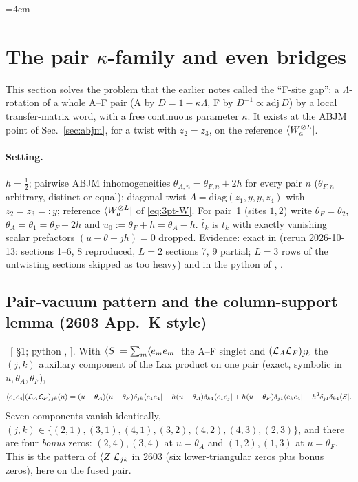\begingroup\emergencystretch=4em %
\section{The pair $\kappa$-family and even bridges}\label{sec:kappa}

This section solves the problem that the earlier notes called the ``F-site gap'': a $\Lambda$-rotation of a whole A--F pair
(A by $D=1-\kappa\Lambda$, F by $D^{-1}\propto\mathrm{adj}\,D$) by a local transfer-matrix word, with a free continuous parameter
$\kappa$. It exists at the ABJM point of Sec.~\ref{sec:abjm}, for a twist with $z_2=z_3$, on the reference $\langle W_a^{\otimes L}|$.

\paragraph{Setting.} $h=\tfrac12$; pairwise ABJM inhomogeneities $\theta_{A,n}=\theta_{F,n}+2h$ for every pair $n$ ($\theta_{F,n}$ arbitrary, distinct
or equal); diagonal twist $\Lambda=\mathrm{diag}(z_1,y,y,z_4)$ with $z_2=z_3=:y$; reference $\langle W_a^{\otimes L}|$ of \eqref{eq:3pt-W}. For pair~1
(sites $1,2$) write $\theta_F=\theta_2$, $\theta_A=\theta_1=\theta_F+2h$ and $u_0:=\theta_F+h=\theta_A-h$. $\hat t_k$ is $t_k$ with exactly
vanishing scalar prefactors $(u-\theta-jh)=0$ dropped. Evidence: exact in  (rerun 2026-10-13: sections 1--6, 8 reproduced, $L=2$ sections 7, 9 partial;
$L=3$ rows of the untwisting sections skipped as too heavy) and in the python of , .

\subsection{Pair-vacuum pattern and the column-support lemma (2603 App.~K style)}\label{sec:kappa-lemma}

\ex\ [ \S1; python , ]. With $\langle S|=\sum_m\langle e_me_m|$ the A--F singlet and
$(\mathcal L_A\mathcal L_F)_{jk}$ the $(j,k)$ auxiliary component of the Lax product on one pair (exact, symbolic in $u,\theta_A,\theta_F$),
\begin{equation}\label{eq:kappa-pattern}
 \langle e_1e_4|(\mathcal L_A\mathcal L_F)_{jk}(u)=(u-\theta_A)(u-\theta_F)\delta_{jk}\langle e_1e_4|-h(u-\theta_A)\delta_{k4}\langle e_1e_j|+h(u-\theta_F)\delta_{j1}\langle e_ke_4|-h^2\delta_{j1}\delta_{k4}\langle S| .
\end{equation}
Seven components vanish identically, $(j,k)\in\{(2,1),(3,1),(4,1),(3,2),(4,2),(4,3),(2,3)\}$, and there are four \emph{bonus} zeros:
$(2,4),(3,4)$ at $u=\theta_A$ and $(1,2),(1,3)$ at $u=\theta_F$. This is the pattern of $\langle Z|\mathcal L_{jk}$ in 2603 (six lower-triangular zeros plus bonus zeros), here on the fused pair.

